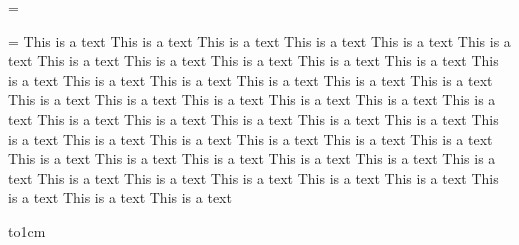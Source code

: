 
\newbox\etude 
\setbox\etude=\vbox{
\vskip1cm\null}


\newbox\lines 
\setbox\lines=\vbox{\hsize=6cm
This is a text This is a text This is a text 
This is a text This is a text This is a text 
This is a text This is a text This is a text 
This is a text This is a text This is a text 
This is a text This is a text This is a text 
This is a text This is a text This is a text 
This is a text This is a text This is a text 
This is a text This is a text This is a text 
This is a text This is a text This is a text 
This is a text This is a text This is a text 
This is a text This is a text This is a text 
This is a text This is a text This is a text 
This is a text This is a text This is a text 
This is a text This is a text This is a text 
This is a text This is a text This is a text 
This is a text This is a text This is a text 
}

\hbox{\copy\etude\vbox{\hbox to1cm{}}\copy\lines}

\bye
